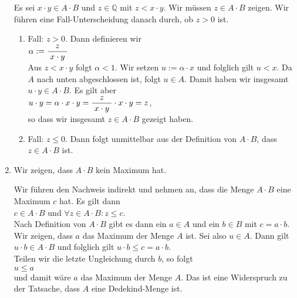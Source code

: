 \begin{enumerate}
      Es sei $x \cdot y \in A \cdot B$ und $z \in \mathbb{Q}$ mit $z < x \cdot y$.  
      Wir m\"ussen $z \in A \cdot B$ zeigen.  
      Wir f\"uhren eine Fall-Unterscheidung danach durch, ob $z > 0$ ist.
      \begin{enumerate}
      \item Fall: $z > 0$.  Dann definieren wir
            \\[0.2cm]
            \hspace*{1.3cm}
            $\alpha := \displaystyle\frac{\;\displaystyle z\;}{\;\displaystyle x \cdot y\;}$
            \\[0.2cm]
            Aus $z < x \cdot y$ folgt $\alpha < 1$.  Wir setzen $u := \alpha \cdot x$
            und folglich gilt $u < x$.  Da $A$ nach unten abgeschlossen ist, folgt $u \in A$.
            Damit haben wir insgesamt $u \cdot y \in A \cdot B$.  Es gilt aber
            \\[0.2cm]
            \hspace*{1.3cm}
            $u \cdot y = \alpha \cdot x \cdot y = \displaystyle\frac{\;\displaystyle z\;}{\;\displaystyle x \cdot y\;} \cdot x \cdot y = z$,
            \\[0.2cm]
            so dass wir insgesamt $z \in A \cdot B$ gezeigt haben.
      \item Fall: $z \leq 0$.  Dann folgt unmittelbar aus der Definition von $A \cdot B$, dass 
            $z \in A \cdot B$  ist.
      \end{enumerate}
\item Wir zeigen, dass $A \cdot B$ kein Maximum hat.  

      Wir f\"uhren den Nachweis indirekt und nehmen an, dass die Menge $A \cdot B$ eine Maximum $c$ hat.
      Es gilt dann 
      \\[0.2cm]
      \hspace*{1.3cm}
      $c \in A \cdot B$ \quad und \quad $\forall z \in A \cdot B: z \leq c$.
      \\[0.2cm]
      Nach Definition von $A \cdot B$ gibt es dann ein $a \in A$ und ein $b \in B$ mit $c = a \cdot b$.
      Wir zeigen, dass $a$ das Maximum der Menge $A$ ist.  Sei also $u \in A$.  Dann gilt
      \\[0.2cm]
      \hspace*{1.3cm}
      $u \cdot b \in A \cdot B$ \quad und folglich gilt \quad $u \cdot b \leq c = a \cdot b$.
      \\[0.2cm]
      Teilen wir die letzte Ungleichung durch $b$, so folgt
      \\[0.2cm]
      \hspace*{1.3cm}
      $u \leq a$
      \\[0.2cm]
      und damit w\"are $a$ das Maximum der Menge $A$.  Das ist eine Widerspruch zu der Tatsache, dass
      $A$ eine Dedekind-Menge ist.
\end{enumerate}
